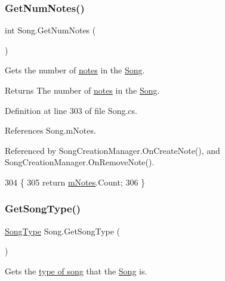 \subsubsection{\texorpdfstring{Get\+Num\+Notes()}{GetNumNotes()}}
{\footnotesize\ttfamily int Song.\+Get\+Num\+Notes (\begin{DoxyParamCaption}{ }\end{DoxyParamCaption})}



Gets the number of \hyperlink{group___music_structs_struct_music_1_1_combined_note}{notes} in the \hyperlink{class_song}{Song}. 

\begin{DoxyReturn}{Returns}
The number of \hyperlink{group___music_structs_struct_music_1_1_combined_note}{notes} in the \hyperlink{class_song}{Song}. 
\end{DoxyReturn}


Definition at line 303 of file Song.\+cs.



References Song.\+m\+Notes.



Referenced by Song\+Creation\+Manager.\+On\+Create\+Note(), and Song\+Creation\+Manager.\+On\+Remove\+Note().


\begin{DoxyCode}
304     \{
305         \textcolor{keywordflow}{return} \hyperlink{group___song_priv_var_ga674bc904a1f856d485d5fb7fe84bac85}{mNotes}.Count;
306     \}
\end{DoxyCode}
\mbox{\label{group___song_pub_func_gabae5b5d8f727b2d9da7867a99347f86b}} 
\subsubsection{\texorpdfstring{Get\+Song\+Type()}{GetSongType()}}
{\footnotesize\ttfamily \hyperlink{group___song_enums_gae681a1f001333e39fc1cb4fea97bfe1b}{Song\+Type} Song.\+Get\+Song\+Type (\begin{DoxyParamCaption}{ }\end{DoxyParamCaption})}



Gets the \hyperlink{group___song_enums_gae681a1f001333e39fc1cb4fea97bfe1b}{type of song} that the \hyperlink{class_song}{Song} is. 

